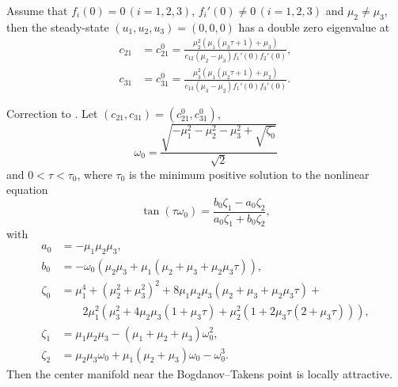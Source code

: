 \begin{lemma}
\label{btdde:lem:BAM_double_eigenvalue}
Assume that $f_{i}(0)=0\,(i=1,2,3)$,
$f_{i}'(0)\neq0\,(i=1,2,3)$ and $\mu_{2}\neq\mu_{3}$, then the steady-state
$(u_{1},u_{2},u_{3})=(0,0,0)$ has a double zero eigenvalue at 
\begin{align*}
c_{21} & =c_{21}^{0}=\frac{\mu_{2}^{2}\left(\mu_{1}\left(\mu_{3}\tau+1\right)+\mu_{3}\right)}{c_{12}\left(\mu_{2}-\mu_{3}\right)f_{1}'(0)f_{2}'(0)},\\
c_{31} & =c_{31}^{0}=\frac{\mu_{3}^{2}\left(\mu_{1}\left(\mu_{2}\tau+1\right)+\mu_{2}\right)}{c_{13}\left(\mu_{3}-\mu_{2}\right)f_{1}'(0)f_{3}'(0)}.
\end{align*}
\end{lemma}

\begin{lemma}
\label{btdde:lemma:triNeuralBAMNetworkModelEigenvalues}
\textup{Correction to \cite[Lemma 3]{dong2013bogdanov}.}
Let $(c_{21},c_{31})=(c_{21}^{0},c_{31}^{0})$,
\begin{equation}
    \label{btdde:sm:eq:omega_0} 
    \omega_0 = \frac{\sqrt{-\mu_1^2 - \mu_2^2 - \mu_3^2 + \sqrt{\zeta_0}}}{\sqrt{2}}
\end{equation}
and $0<\tau<\tau_{0}$, where $\tau_0$ is the minimum positive solution to the nonlinear equation
\begin{equation}
    \label{btdde:sm:eq:tan} 
    \tan (\tau \omega_0) = \frac{b_0\zeta_1 - a_0\zeta_2}{a_0\zeta_1 + b_0\zeta_2},
\end{equation}
with
\begin{align*}
a_0 &= -\mu_1\mu_2\mu_3, \\ 
b_0 &= -\omega_0(\mu_2\mu_3 + \mu_1(\mu_2 + \mu_3 + \mu_2\mu_3\tau)), \\
\zeta_0 &= \mu_1^4 + (\mu_2^2 + \mu_3^2)^2 + 8\mu_1\mu_2\mu_3(\mu_2 + \mu_3 + \mu_2\mu_3\tau) + \\
        &\qquad 2\mu_1^2(\mu_3^2 + 4\mu_2\mu_3(1 + \mu_3\tau) + \mu_2^2(1 + 2\mu_3\tau(2 + \mu_3\tau))), \\
\zeta_1 &= \mu_1\mu_2\mu_3 - (\mu_1 + \mu_2 + \mu_3)\omega_0^2, \\
\zeta_2 &= \mu_2\mu_3\omega_0 + \mu_1(\mu_2 + \mu_3)\omega_0 - \omega_0^3.
\end{align*}
Then the center manifold near the Bogdanov--Takens point is locally attractive.
\end{lemma}

